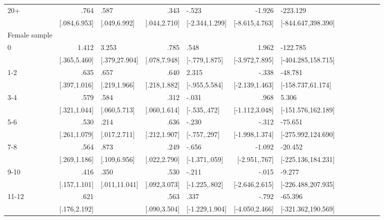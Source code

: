 \begin{table}[hp]
\begin{adjustbox}{max width=\linewidth}
\begin{threeparttable}
{\begin{tabular}{l*{6}{D{.}{.}{-1}l}}
20+             &            .764&            .587&            .343&           -.523&          -1.926&        -223.129\\
                &    [.084,6.953]&    [.049,6.992]&    [.044,2.710]&  [-2.344,1.299]&  [-8.615,4.763]&[-844.647,398.390]\\
\midrule
Female sample &&&&&&\\
0               &           1.412&           3.253&            .785&            .548&           1.962&        -122.785\\
                &    [.365,5.460]&   [.379,27.904]&    [.078,7.948]&   [-.779,1.875]&  [-3.972,7.895]&[-404.285,158.715]\\

1-2             &            .635&            .657&            .640&           2.315&           -.338&         -48.781\\
                &    [.397,1.016]&    [.219,1.966]&    [.218,1.882]&   [-.955,5.584]&  [-2.139,1.463]&[-158.737,61.174]\\

3-4             &            .579&            .584&            .312&           -.031&            .968&           5.306\\
                &    [.321,1.044]&    [.060,5.713]&    [.060,1.614]&    [-.535,.472]&  [-1.112,3.048]&[-151.576,162.189]\\

5-6             &            .530&            .214&            .636&           -.230&           -.312&         -75.651\\
                &    [.261,1.079]&    [.017,2.711]&    [.212,1.907]&    [-.757,.297]&  [-1.998,1.374]&[-275.992,124.690]\\

7-8             &            .564&            .873&            .249&           -.656&          -1.092&         -20.452\\
                &    [.269,1.186]&    [.109,6.956]&    [.022,2.790]&   [-1.371,.059]&   [-2.951,.767]&[-225.136,184.231]\\

9-10            &            .416&            .350&            .530&           -.211&           -.015&          -9.277\\
                &    [.157,1.101]&   [.011,11.041]&    [.092,3.073]&   [-1.225,.802]&  [-2.646,2.615]&[-226.488,207.935]\\

11-12           &            .621&                &            .563&            .337&           -.792&         -65.396\\
                &    [.176,2.192]&                &    [.090,3.504]&  [-1.229,1.904]&  [-4.050,2.466]&[-321.362,190.569]\\


\end{tabular}}
\end{threeparttable}
\end{adjustbox}
\end{table}
